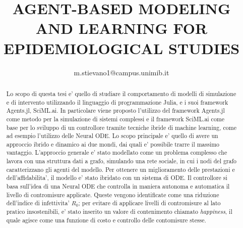 \documentclass{article}
\title{AGENT-BASED MODELING AND LEARNING FOR EPIDEMIOLOGICAL STUDIES}
\author{m.stievano1@campus.unimib.it}
\begin{document}


\begin{abstract}
    Lo scopo di questa tesi e' quello di studiare il comportamento di modelli di simulazione
    e di intervento utilizzando il linguaggio di programmazione Julia, e i suoi framework
    Agents.jl, SciML.ai. In particolare viene proposto l'utilizzo del framework Agents.jl come 
    metodo per la simulazione di sistemi complessi e il framework SciML.ai come base per 
    lo sviluppo di un controllore tramite tecniche ibride di machine learning, come ad esempio 
    l'utilizzo delle Neural ODE. Lo scopo principale e' quello di avere un approccio ibrido e dinamico 
    ai due mondi, dai quali e' possibile trarre il massimo vantaggio. L'approccio generale 
    e' stato modellato come un problema complesso che lavora con una struttura dati a grafo, simulando
    una rete sociale, in cui i nodi del grafo caratterizzano gli agenti del modello. Per ottenere un 
    miglioramento delle prestazioni e dell'affidabilita', il modello e' stato ibridato con 
    un sistema di ODE. Il controllore si basa sull'idea di una Neural ODE che controlla 
    in maniera autonoma e automatica il livello di contromisure applicate. Queste vengono 
    identificate come una riduzione dell'indice di infettivita' $R_0$; per evitare di applicare 
    livelli di contromisure al lato pratico insostenibili, e' stato inserito un valore di contenimento 
    chiamato \emph{happiness}, il quale agisce come una funzione di costo e controllo delle contomisure stesse.
\end{abstract}



\tableofcontents
\newpage
\listoffigures
\newpage
\listoftables
\newpage














% 
% 

\nocite{*}

% 
% 



\appendix

\end{document}
